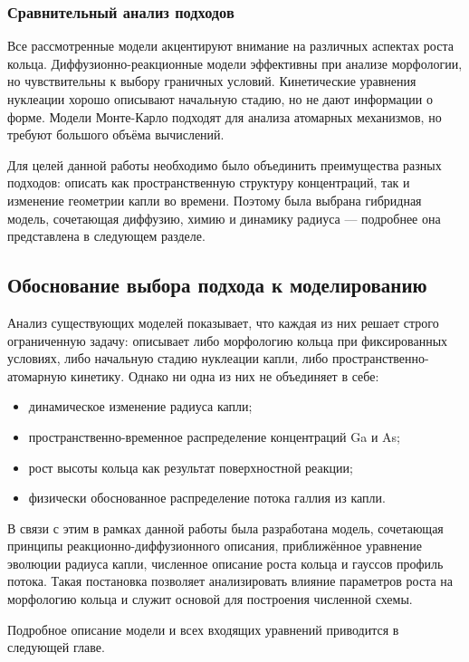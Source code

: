 \documentclass[14pt,oneside]{extarticle}
\begin{document}
\subsubsection*{Сравнительный анализ подходов}
Все рассмотренные модели акцентируют внимание на различных аспектах роста кольца. Диффузионно-реакционные модели эффективны при анализе морфологии, но чувствительны к выбору граничных условий. Кинетические уравнения нуклеации хорошо описывают начальную стадию, но не дают информации о форме. Модели Монте-Карло подходят для анализа атомарных механизмов, но требуют большого объёма вычислений.

Для целей данной работы необходимо было объединить преимущества разных подходов: описать как пространственную структуру концентраций, так и изменение геометрии капли во времени. Поэтому была выбрана гибридная модель, сочетающая диффузию, химию и динамику радиуса — подробнее она представлена в следующем разделе.

\subsection{Обоснование выбора подхода к моделированию}

Анализ существующих моделей показывает, что каждая из них решает строго ограниченную задачу: описывает либо морфологию кольца при фиксированных условиях, либо начальную стадию нуклеации капли, либо пространственно-атомарную кинетику. Однако ни одна из них не объединяет в себе:

\begin{itemize}
  \item динамическое изменение радиуса капли;
  \item пространственно-временное распределение концентраций Ga и As;
  \item рост высоты кольца как результат поверхностной реакции;
  \item физически обоснованное распределение потока галлия из капли.
\end{itemize}

В связи с этим в рамках данной работы была разработана модель, сочетающая принципы реакционно-диффузионного описания, приближённое уравнение эволюции радиуса капли, численное описание роста кольца и гауссов профиль потока. Такая постановка позволяет анализировать влияние параметров роста на морфологию кольца и служит основой для построения численной схемы.

Подробное описание модели и всех входящих уравнений приводится в следующей главе.
\end{document}
